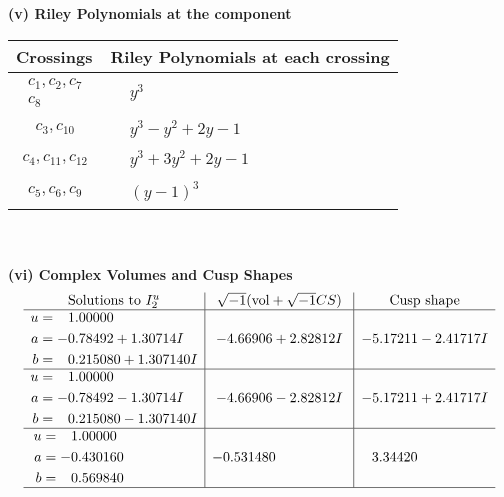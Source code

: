 \documentclass[1p]{elsarticle_modified}
\theoremstyle{definition}
\newcommand{\I}{\sqrt{-1}}
\begin{document}
\newpage\renewcommand{\arraystretch}{1}
\flushleft \textbf{(v) Riley Polynomials at the component}\newline \\
\begin{tabular}{m{50pt}|m{274pt}}
Crossings & \hspace{64pt}Riley Polynomials at each crossing \\
\hline $$\begin{aligned}c_{1},c_{2},c_{7}\\c_{8}\end{aligned}$$&$\begin{aligned}
&y^3
\end{aligned}$\\
\hline $$\begin{aligned}c_{3},c_{10}\end{aligned}$$&$\begin{aligned}
&y^3- y^2+2 y-1
\end{aligned}$\\
\hline $$\begin{aligned}c_{4},c_{11},c_{12}\end{aligned}$$&$\begin{aligned}
&y^3+3 y^2+2 y-1
\end{aligned}$\\
\hline $$\begin{aligned}c_{5},c_{6},c_{9}\end{aligned}$$&$\begin{aligned}
&(y-1)^3
\end{aligned}$\\
\hline
\end{tabular}\\~\\
\newpage\flushleft \textbf{(vi) Complex Volumes and Cusp Shapes}
$$\begin{array}{c|c|c}  
\text{Solutions to }I^u_{2}& \I (\text{vol} + \sqrt{-1}CS) & \text{Cusp shape}\\
 \hline 
\begin{aligned}
u &= \phantom{-}1.00000\phantom{ +0.000000I} \\
a &= -0.78492 + 1.30714 I \\
b &= \phantom{-}0.215080 + 1.307140 I\end{aligned}
 & -4.66906 + 2.82812 I & -5.17211 - 2.41717 I \\ \hline\begin{aligned}
u &= \phantom{-}1.00000\phantom{ +0.000000I} \\
a &= -0.78492 - 1.30714 I \\
b &= \phantom{-}0.215080 - 1.307140 I\end{aligned}
 & -4.66906 - 2.82812 I & -5.17211 + 2.41717 I \\ \hline\begin{aligned}
u &= \phantom{-}1.00000\phantom{ +0.000000I} \\
a &= -0.430160\phantom{ +0.000000I} \\
b &= \phantom{-}0.569840\phantom{ +0.000000I}\end{aligned}
 & -0.531480\phantom{ +0.000000I} & \phantom{-}3.34420\phantom{ +0.000000I}\\
 \hline 
 \end{array}$$\newpage
\end{document}
